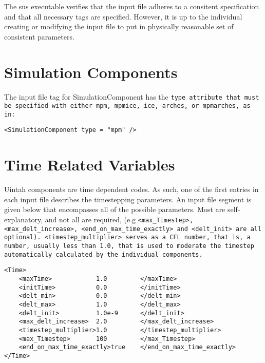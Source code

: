 The sus executable verifies that the input file adheres to a consitent
specification and that all necessary tags are specified.  However, it
is up to the individual creating or modifying the input file to put in
physically reasonable set of consistent parameters.


\section{Simulation Components} \label{Sec:SimulationComponent}

The input file tag for SimulationComponent has the \tt type \normalfont
attribute that must be specified with either \tt mpm, mpmice, ice, arches,
\normalfont or \tt mpmarches, \normalfont as in:

\begin{Verbatim}[fontsize=\footnotesize]
<SimulationComponent type = "mpm" />
\end{Verbatim}



\section{Time Related Variables} \label{Sec:TimeRelatedVariables}
Uintah components are time dependent codes.  As such, one of the first
entries in each input file describes the timestepping parameters.  An
input file segment is given below that encompasses all of the possible
parameters.  Most are self-explanatory, and not all are required, (e.g
\tt <max\_Timestep>, <max\_delt\_increase>,
<end\_on\_max\_time\_exactly> \normalfont and \tt <delt\_init>
\normalfont are all optional).  \tt <timestep\_multiplier> \normalfont
serves as a CFL number, that is, a number, usually less than 1.0, that
is used to moderate the timestep automatically calculated by the
individual components.

\begin{Verbatim}[fontsize=\footnotesize]
<Time>
    <maxTime>            1.0         </maxTime>
    <initTime>           0.0         </initTime>
    <delt_min>           0.0         </delt_min>
    <delt_max>           1.0         </delt_max>
    <delt_init>          1.0e-9      </delt_init>
    <max_delt_increase>  2.0         </max_delt_increase>
    <timestep_multiplier>1.0         </timestep_multiplier>
    <max_Timestep>       100         </max_Timestep>
    <end_on_max_time_exactly>true    </end_on_max_time_exactly>
</Time>
\end{Verbatim}
%
